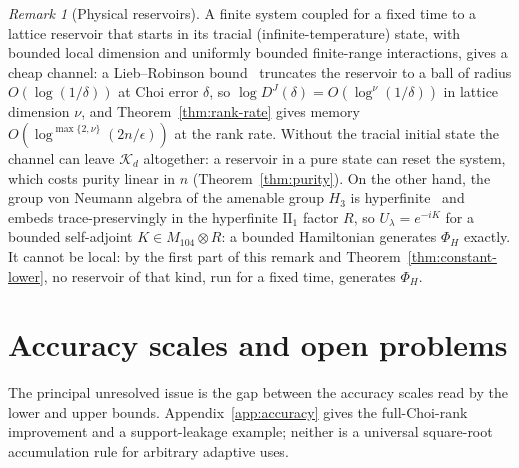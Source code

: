 \documentclass[11pt,a4paper]{article}
\theoremstyle{plain}
\theoremstyle{definition}
\theoremstyle{remark}
\newtheorem{remark}[theorem]{Remark}
\newcommand{\DChoi}{D^{J}}
\begin{document}
\begin{remark}[Physical reservoirs]\label{rem:physical}
A finite system coupled for a fixed time to a lattice reservoir that starts in its tracial (infinite-temperature) state, with bounded local
dimension and uniformly bounded finite-range interactions, gives a cheap channel: a Lieb--Robinson bound~\cite{LiebRobinson1972,BHV2006}
truncates the reservoir to a ball of radius $O(\log(1/\delta))$ at Choi error $\delta$, so $\log\DChoi(\delta)=O(\log^\nu(1/\delta))$ in lattice
dimension $\nu$, and Theorem~\ref{thm:rank-rate} gives memory $O(\log^{\max\{2,\nu\}}(2n/\epsilon))$ at the rank rate.
Without the tracial initial state the channel can leave $\mathcal K_d$ altogether: a reservoir in a pure state can reset the system, which costs
purity linear in $n$ (Theorem~\ref{thm:purity}). On the other hand, the group von Neumann algebra of the amenable group $H_3$ is
hyperfinite~\cite{Connes1976} and embeds trace-preservingly in the hyperfinite $\mathrm{II}_1$ factor $R$, so $U_\lambda=e^{-iK}$ for a bounded
self-adjoint $K\in M_{104}\otimes R$: a bounded Hamiltonian generates $\Phi_H$ exactly. It cannot be local: by the first part of this remark and
Theorem~\ref{thm:constant-lower}, no reservoir of that kind, run for a fixed time, generates $\Phi_H$.
\end{remark}


\section{Accuracy scales and open problems}\label{sec:open}


The principal unresolved issue is the gap between the accuracy
scales read by the lower and upper bounds. Appendix~\ref{app:accuracy} gives
the full-Choi-rank improvement and a support-leakage example; neither is a
universal square-root accumulation rule for arbitrary adaptive uses.
\end{document}
